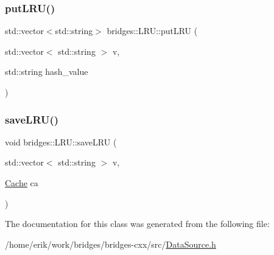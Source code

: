 \mbox{\label{classbridges_1_1_l_r_u_a6d5cfb59d2333dd7e20c426a58a9ea55}} 
\subsubsection{\texorpdfstring{put\+L\+R\+U()}{putLRU()}}
{\footnotesize\ttfamily std\+::vector$<$std\+::string$>$ bridges\+::\+L\+R\+U\+::put\+L\+RU (\begin{DoxyParamCaption}\item[{std\+::vector$<$ std\+::string $>$}]{v,  }\item[{std\+::string}]{hash\+\_\+value }\end{DoxyParamCaption})\hspace{0.3cm}{\ttfamily [inline]}}

\mbox{\label{classbridges_1_1_l_r_u_a1fb694f9c4401d8e9fd3ca0d5cc5562c}} 
\subsubsection{\texorpdfstring{save\+L\+R\+U()}{saveLRU()}}
{\footnotesize\ttfamily void bridges\+::\+L\+R\+U\+::save\+L\+RU (\begin{DoxyParamCaption}\item[{std\+::vector$<$ std\+::string $>$}]{v,  }\item[{\hyperlink{classbridges_1_1_cache}{Cache}}]{ca }\end{DoxyParamCaption})\hspace{0.3cm}{\ttfamily [inline]}}



The documentation for this class was generated from the following file\+:\begin{DoxyCompactItemize}
\item 
/home/erik/work/bridges/bridges-\/cxx/src/\hyperlink{_data_source_8h}{Data\+Source.\+h}\end{DoxyCompactItemize}
